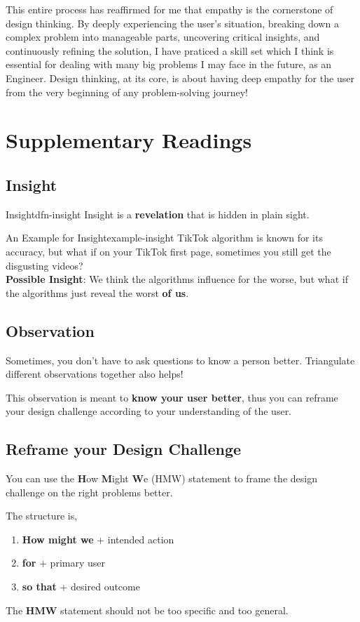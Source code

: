 \documentclass[math,code]{amznotes}
\theoremstyle{remark}
\begin{document}
This entire process has reaffirmed for me that empathy is the cornerstone of design thinking. By deeply experiencing the user’s situation, breaking down a complex problem into manageable parts, uncovering critical insights, and continuously refining the solution, I have praticed a skill set which I think is essential for dealing with many big problems I may face in the future, as an Engineer. Design thinking, at its core, is about having deep empathy for the user from the very beginning of any problem-solving journey!

\section{Supplementary Readings}
\subsection{Insight}
\begin{dfnbox}{Insight}{dfn-insight}
    {\color{red} Insight} is a \textbf{revelation} that is hidden in plain sight.
\end{dfnbox}
\begin{exbox}{An Example for Insight}{example-insight}
    TikTok algorithm is known for its accuracy, but what if on your TikTok first page, sometimes you still get the disgusting videos? \\
    \textbf{Possible Insight}: We think the algorithms influence for the worse, but what if the algorithms just reveal the worst \textbf{of us}.
\end{exbox}

\subsection{Observation}
Sometimes, you don't have to ask questions to know a person better. Triangulate different observations together also helps!

This observation is meant to \textbf{know your user better}, thus you can reframe your design challenge according to your understanding of the user.

\subsection{Reframe your Design Challenge}
You can use the \textbf{H}ow \textbf{M}ight \textbf{W}e (HMW) statement to frame the design challenge on the right problems better.

The structure is,
\begin{enumerate}
    \item \textbf{How might we} + intended action
    \item \textbf{for} + primary user
    \item \textbf{so that} + desired outcome
\end{enumerate}
The \textbf{HMW} statement should not be too specific and too general.
\end{document}
